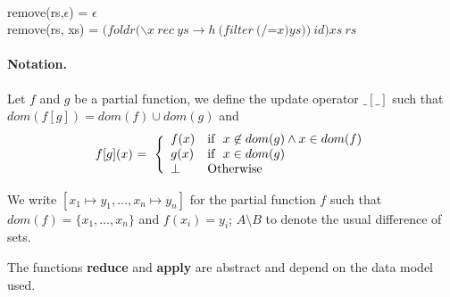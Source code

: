 \documentclass[envcountsect,runningheads,orivec]{llncs}
\begin{document}
\begin{flushleft}
 \\
remove(rs,$\epsilon$) = $\epsilon$ \\
remove(rs, xs) = $(foldr (\backslash x\ rec\ ys\to h \ (filter \ (/$=$x) ys))\ id) xs \ rs$\\
\end{flushleft}

\normalfont
\normalsize

\paragraph{Notation.} Let $f$ and $g$ be a partial function, we define the update operator $\_[\_]$ such that
  $dom(f[g])  = dom(f) \cup dom(g)$ and 
 \[
   \begin{array}{l@{\ = \ \Bigg\{}l}
     f[g](x) & 
     \begin{array}{ll}
        f(x) & \mbox{if }\ x\not\in dom(g) \wedge x\in dom(f) \\
        g(x) & \mbox{if }\ x\in dom(g)\\
        \mathit{\undefined}  & \mbox{Otherwise} 
     \end{array}
   \end{array}
 \]    

 We write $[x_1 \mapsto y_1, \ldots, x_n \mapsto y_n]$ for the partial function $f$ such that $dom(f)=\{x_1,\ldots,x_n\}$ and $f(x_i)=y_i$; $A \setminus B$ to denote the usual difference of sets.



The functions \textbf{reduce} and \textbf{apply} are abstract and depend on the data model used. 
\end{document}
